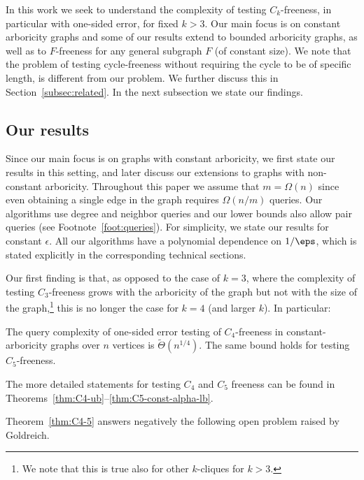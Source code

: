 In this work we seek to understand the complexity of testing $C_k$-freeness, in particular with one-sided error, for fixed $k> 3$. Our main focus is on constant arboricity graphs and some of our results extend to bounded arboricity graphs, as well as to $F$-freeness for any general subgraph $F$ (of constant size). 
We note that the problem of testing cycle-freeness
without requiring the cycle to be of specific length, is  different from our problem. We further discuss this in Section~\ref{subsec:related}.
In the next subsection we state our findings.



\subsection{Our results}

Since our main focus is on graphs with constant arboricity, we first state our results in this setting, and later discuss our extensions to graphs with non-constant arboricity.
Throughout this paper we assume that $m = \Omega(n)$ since  %
even obtaining a single edge in the graph requires $\Omega(n/m)$ queries. 
Our algorithms use degree and neighbor queries and our lower bounds also allow pair queries (see Footnote~\ref{foot:queries}).
For simplicity, we state our results for constant $\epsilon$. All our algorithms have a polynomial dependence on $1/\eps$, which is stated explicitly in the corresponding technical sections.




Our first finding is that, as opposed to the case of $k=3$, where the complexity of testing $C_3$-freeness grows with the arboricity of the graph but not with the size of the graph,\footnote{We note that this is true also for other $k$-cliques for $k > 3$.} this is no longer the case for $k=4$ (and larger $k$). In particular: 

\begin{theorem}\label{thm:C4-5}
The query complexity of one-sided error testing of $C_4$-freeness in constant-arboricity graphs over $n$ vertices is $\widetilde{\Theta}(n^{1/4})$.
The same bound holds for testing $C_5$-freeness.
\end{theorem}
 The more detailed statements for testing $C_4$ and $C_5$ freeness 
can be found in Theorems~\ref{thm:C4-ub}--\ref{thm:C5-const-alpha-lb}.

Theorem~\ref{thm:C4-5} 
answers negatively  the following open problem raised by Goldreich.

